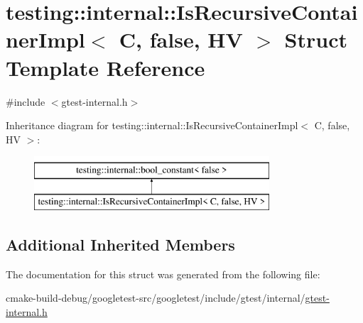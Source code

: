 \hypertarget{structtesting_1_1internal_1_1IsRecursiveContainerImpl_3_01C_00_01false_00_01HV_01_4}{}\section{testing\+::internal\+::Is\+Recursive\+Container\+Impl$<$ C, false, HV $>$ Struct Template Reference}
\label{structtesting_1_1internal_1_1IsRecursiveContainerImpl_3_01C_00_01false_00_01HV_01_4}


{\ttfamily \#include $<$gtest-\/internal.\+h$>$}

Inheritance diagram for testing\+::internal\+::Is\+Recursive\+Container\+Impl$<$ C, false, HV $>$\+:\begin{figure}[H]
\begin{center}
\leavevmode
\includegraphics[height=2.000000cm]{structtesting_1_1internal_1_1IsRecursiveContainerImpl_3_01C_00_01false_00_01HV_01_4}
\end{center}
\end{figure}
\subsection*{Additional Inherited Members}


The documentation for this struct was generated from the following file\+:\begin{DoxyCompactItemize}
\item 
cmake-\/build-\/debug/googletest-\/src/googletest/include/gtest/internal/\mbox{\hyperlink{gtest-internal_8h}{gtest-\/internal.\+h}}\end{DoxyCompactItemize}
